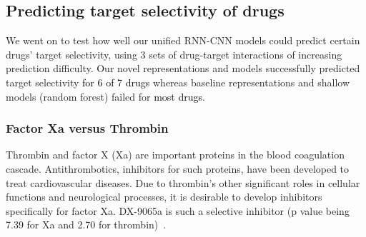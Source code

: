 \documentclass[nocrop]{bioinfo}
\newcommand{\red}[1]{\textcolor{black}{#1}}
\begin{document}
\vspace{-1em}
\subsection{Predicting target selectivity of drugs}
We went on to test how well our unified RNN-CNN models could predict certain drugs' target selectivity, using 3 sets of drug-target interactions of increasing prediction difficulty. Our novel representations and models successfully predicted target selectivity \red{for 6 of 7 drugs} whereas baseline representations and shallow models (random forest) failed for \red{most drugs}.  
 


\vspace{-1em}
\subsubsection{Factor Xa versus Thrombin}

Thrombin and factor X  (Xa) are important proteins in the blood coagulation cascade. Antithrombotics, inhibitors for such proteins, have been developed to treat cardiovascular diseases. Due to thrombin's other significant roles in cellular functions and neurological processes, it is desirable to develop inhibitors specifically for factor Xa.  DX-9065a is such a selective inhibitor  (p value being 7.39 for Xa and 2.70 for thrombin)~\citep{brandstetter1996x}. 
\end{document}
